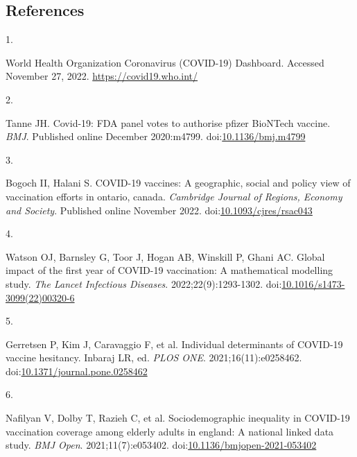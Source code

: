 \documentclass[
  letterpaper,
  DIV=11,
  numbers=noendperiod]{scrartcl}
\newlength{\cslhangindent}
\newlength{\csllabelwidth}
\newlength{\cslentryspacingunit} %
\newenvironment{CSLReferences}[2] %
 {%
  \setlength{\parindent}{0pt}
  \ifodd #1
  \let\oldpar\par
  \def\par{\hangindent=\cslhangindent\oldpar}
  \fi
  \setlength{\parskip}{#2\cslentryspacingunit}
 }%
 {}
\newcommand{\CSLLeftMargin}[1]{\parbox[t]{\csllabelwidth}{#1}}
\newcommand{\CSLRightInline}[1]{\parbox[t]{\linewidth - \csllabelwidth}{#1}\break}
\begin{document}
\FloatBarrier

\hypertarget{references}{%
\subsection{References}\label{references}}

\hypertarget{refs}{}
\begin{CSLReferences}{0}{0}
\leavevmode{}%
\CSLLeftMargin{1. }%
\CSLRightInline{{World Health Organization Coronavirus (COVID-19)
Dashboard}. Accessed November 27, 2022. \url{https://covid19.who.int/}}

\leavevmode{}%
\CSLLeftMargin{2. }%
\CSLRightInline{Tanne JH. Covid-19: {FDA} panel votes to authorise
pfizer {BioNTech} vaccine. \emph{{BMJ}}. Published online December
2020:m4799.
doi:\href{https://doi.org/10.1136/bmj.m4799}{10.1136/bmj.m4799}}

\leavevmode{}%
\CSLLeftMargin{3. }%
\CSLRightInline{Bogoch II, Halani S. {COVID}-19 vaccines: A geographic,
social and policy view of vaccination efforts in ontario, canada.
\emph{Cambridge Journal of Regions, Economy and Society}. Published
online November 2022.
doi:\href{https://doi.org/10.1093/cjres/rsac043}{10.1093/cjres/rsac043}}

\leavevmode{}%
\CSLLeftMargin{4. }%
\CSLRightInline{Watson OJ, Barnsley G, Toor J, Hogan AB, Winskill P,
Ghani AC. Global impact of the first year of {COVID}-19 vaccination: A
mathematical modelling study. \emph{The Lancet Infectious Diseases}.
2022;22(9):1293-1302.
doi:\href{https://doi.org/10.1016/s1473-3099(22)00320-6}{10.1016/s1473-3099(22)00320-6}}

\leavevmode{}%
\CSLLeftMargin{5. }%
\CSLRightInline{Gerretsen P, Kim J, Caravaggio F, et al. Individual
determinants of {COVID}-19 vaccine hesitancy. Inbaraj LR, ed.
\emph{{PLOS} {ONE}}. 2021;16(11):e0258462.
doi:\href{https://doi.org/10.1371/journal.pone.0258462}{10.1371/journal.pone.0258462}}

\leavevmode{}%
\CSLLeftMargin{6. }%
\CSLRightInline{Nafilyan V, Dolby T, Razieh C, et al. Sociodemographic
inequality in {COVID}-19 vaccination coverage among elderly adults in
england: A national linked data study. \emph{{BMJ} Open}.
2021;11(7):e053402.
doi:\href{https://doi.org/10.1136/bmjopen-2021-053402}{10.1136/bmjopen-2021-053402}}


\end{CSLReferences}
\end{document}
